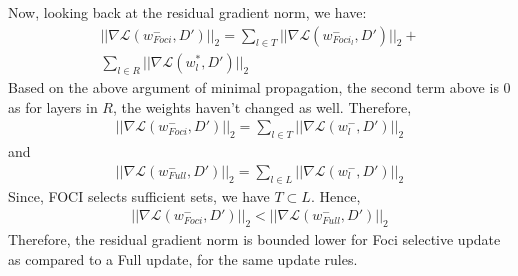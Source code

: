 Now, looking back at the residual gradient norm, we have:
\begin{align}
    \label{eq:foci_res_norm_simplified}
    ||\nabla \mathcal{L}(w^-_{Foci},D')||_2 = \sum_{l \in T} ||\nabla \mathcal{L}(w^-_{Foci_l}, D') ||_2 + \\
    \sum_{l \in R} ||\nabla \mathcal{L}(w^*_{l}, D') ||_2
\end{align}
Based on the above argument of minimal propagation, the second term above is $0$ as for layers in $R$, the weights haven't changed as well.
Therefore,
\begin{align}
    \label{eq:foci_res}
    ||\nabla \mathcal{L}(w^-_{Foci},D')||_2 = \sum_{l \in T} ||\nabla \mathcal{L}(w^-_{l}, D') ||_2 
\end{align}
and 
\begin{align}
    \label{eq:full_res}
    ||\nabla \mathcal{L}(w^-_{Full},D')||_2 = \sum_{l \in L} ||\nabla \mathcal{L}(w^-_{l}, D') ||_2 
\end{align}
Since, FOCI selects sufficient sets, we have $T \subset L$. Hence, 
\begin{align}
    ||\nabla \mathcal{L}(w^-_{Foci},D')||_2 < ||\nabla \mathcal{L}(w^-_{Full},D')||_2 
\end{align}
Therefore, the residual gradient norm is bounded lower for Foci selective update as compared to a Full update, for the same update rules. 







